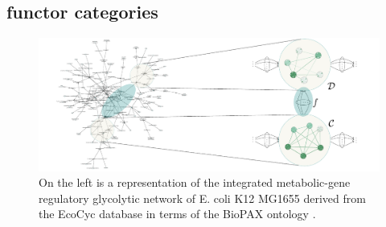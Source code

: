 
\subsection{functor categories}

\begin{frame}
\begin{figure}
\noindent\includegraphics[width=1.0\framewidth]{fig/biograph.pdf}
\caption{
On the left is a representation of the integrated metabolic-gene regulatory glycolytic network of E. coli K12 MG1655 derived from the EcoCyc database \cite{Keseler2011} in terms of the BioPAX ontology \cite{Demir2010}.
}
\label{fig:biograph}
\end{figure}
\end{frame}

